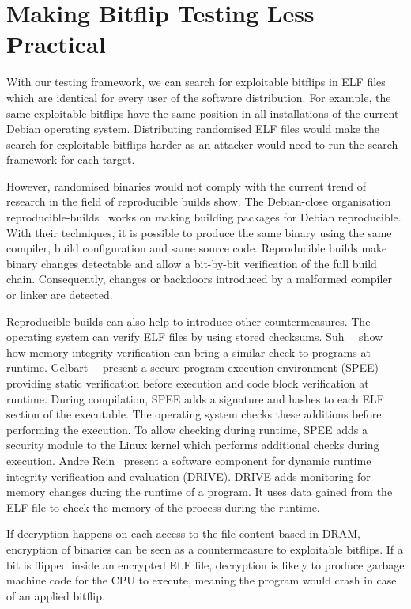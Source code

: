 \section{Making Bitflip Testing Less Practical}

With our testing framework, we can search for exploitable bitflips in ELF files
which are identical for every user of the software distribution. For example,
the same exploitable bitflips have the same position in all installations of the
current Debian operating system. Distributing randomised ELF files would make
the search for exploitable bitflips harder as an attacker would need to run the
search framework for each target.

However, randomised binaries would not comply with the current trend of research
in the field of reproducible builds show. The Debian-close organisation
reproducible-builds~\cite{reporbuilds} works on making building packages for
Debian reproducible. With their techniques, it is possible to produce the same
binary using the same compiler, build configuration and same source code.
Reproducible builds make binary changes detectable and allow a bit-by-bit
verification of the full build chain. Consequently, changes or backdoors
introduced by a malformed compiler or linker are detected.

Reproducible builds can also help to introduce other countermeasures. The
operating system can verify ELF files by using stored checksums.
Suh~\etal~\cite{memintegrity} show how memory integrity verification can bring a
similar check to programs at runtime. Gelbart~\etal~\cite{spee} present a secure
program execution environment (SPEE) providing static verification before
execution and code block verification at runtime. During compilation, SPEE adds
a signature and hashes to each ELF section of the executable. The operating
system checks these additions before performing the execution. To allow checking
during runtime, SPEE adds a security module to the Linux kernel which performs
additional checks during execution. Andre Rein~\cite{drive} present a software
component for dynamic runtime integrity verification and evaluation (DRIVE).
DRIVE adds monitoring for memory changes during the runtime of a program. It
uses data gained from the ELF file to check the memory of the process during the
runtime.

If decryption happens on each access to the file content based in DRAM,
encryption of binaries can be seen as a countermeasure to exploitable bitflips.
If a bit is flipped inside an encrypted ELF file, decryption is likely to
produce garbage machine code for the CPU to execute, meaning the program would
crash in case of an applied bitflip.

